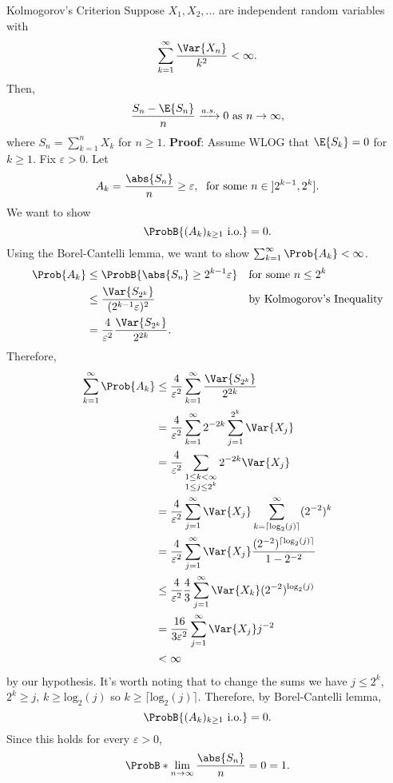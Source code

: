 \begin{Theorem}{Kolmogorov's Criterion}{}
    Suppose $ X_1,X_2,\ldots $ are independent
    random variables with
    \[ \sum_{k=1}^{\infty}\frac{\Var{X_n}}{k^2}<\infty. \]
    Then,
    \[ \frac{S_n-\E{S_n}}{n}\as 0\text{ as $ n\to\infty $}, \]
    where $ S_n=\sum_{k=1}^{n}X_k $ for $ n\ge 1 $.
    \tcblower{}
    \textbf{Proof}: Assume WLOG that
    $ \E{S_k}=0 $ for $ k\ge 1 $. Fix $ \varepsilon>0 $.
    Let
    \[ A_k=\frac{\abs{S_n}}{n}\ge \varepsilon,\; \text{ for some } n\in\interval[open left]{2^{k-1}}{2^k}. \]
    We want to show
    \[ \ProbB{(A_k)_{k\ge 1}\text{ i.o.}}=0. \]
    Using the Borel-Cantelli lemma, we want to show
    $ \sum_{k=1}^{\infty}\Prob{A_k}<\infty $.
    \begin{align*}
        \Prob{A_k}
         & \le\ProbB{\abs{S_n}\ge 2^{k-1}\varepsilon}            &  & \text{for some }n\le 2^k          \\
         & \le \frac{\Var{S_{2^k}}}{(2^{k-1}\varepsilon)^2}      &  & \text{by Kolmogorov's Inequality} \\
         & =\frac{4}{\varepsilon^2}\frac{\Var{S_{2^k}}}{2^{2k}}.
    \end{align*}
    Therefore,
    \begin{align*}
        \sum_{k=1}^{\infty}\Prob{A_k}
         & \le \frac{4}{\varepsilon^2}\sum_{k=1}^{\infty}\frac{\Var{S_{2^k}}}{2^{2k}}                                     \\
         & =\frac{4}{\varepsilon^2}\sum_{k=1}^{\infty}2^{-2k}\sum_{j=1}^{2^k}\Var{X_j}                                    \\
         & =\frac{4}{\varepsilon^2}\sum_{\substack{1\le k<\infty                                                          \\1\le j\le 2^k}}2^{-2k}\Var{X_j}                         \\
         & =\frac{4}{\varepsilon^2}\sum_{j=1}^{\infty}\Var{X_j}\sum_{k=\lceil\mathrm{log}_2(j)\rceil }^{\infty}(2^{-2})^k \\
         & =\frac{4}{\varepsilon^2}\sum_{j=1}^{\infty}\Var{X_j}\frac{(2^{-2})^{\lceil \mathrm{log}_2(j)\rceil}}{1-2^{-2}} \\
         & \le \frac{4}{\varepsilon^2}\frac{4}{3}\sum_{j=1}^{\infty}\Var{X_k}(2^{-2})^{\mathrm{log}_2(j)}                 \\
         & =\frac{16}{3\varepsilon^2}\sum_{j=1}^{\infty}\Var{X_j}j^{-2}                                                   \\
         & <\infty
    \end{align*}
    by our hypothesis. It's worth noting that to change the sums we have
    $ j\le 2^k $, $ 2^k\ge j $, $ k\ge \mathrm{log}_2(j) $ so $ k\ge \lceil \mathrm{log}_2(j)\rceil $.
    Therefore,
    by Borel-Cantelli lemma,
    \[ \ProbB{(A_k)_{k\ge 1}\text{ i.o.}}=0. \]
    Since this holds for every $ \varepsilon>0 $,
    \[ \ProbB*{\lim\limits_{{n} \to {\infty}}\frac{\abs{S_n}}{n}=0}=1. \]
\end{Theorem}
